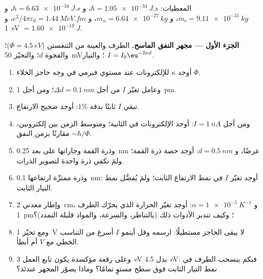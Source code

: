 \begin{problem}\label{pb:b2:potential-wells-tunneling:1}
المعطيات: $\hbar = \qty{1.05e-34}{J.s}$، و $h = \qty{6.63e-34}{J.s}$، و $m_{\text{e}} =
\qty{9.11e-31}{kg}$، و $m_\alpha = \qty{6.64e-27}{kg}$، و $e^2/4\pi\varepsilon_0 =
\qty{1.44}{MeV.fm}$، و \qty{1}{eV} $= \qty{1.60e-19}{J}$.

\textbf{الجزء الأول --- مجهر النفق الماسح.}
الطرف والعينة من التنغستن ($\Phi = \qty{4.5}{eV}$)؛ والفجوة $d$؛ والتحيّز
\qty{50}{mV}؛ والتيار $I = I_0\eu^{-2\kappa d}$.
\begin{enumerate}
  \item أوجد $\kappa$ للإلكترونات عند مستوي فيرمي في وجه حاجز
        الخلاء $\Phi$.
  \item وعامل تغيّر $I$ من أجل $\Delta d = \qty{0.1}{nm}$؛ ومن أجل
        \qty{1}{pm}.
  \item {} تبقي $I$ ثابتًا بدقة $1\%$: أوجد ضجيج الارتفاع.
  \item ومن أجل $I = \qty{1}{nA}$: أوجد الإلكترونات في الثانية؛ ومتوسط الزمن بين
        إلكترونين، مقارنًا بزمن النفق $\sim\hbar/\Phi$.
  \item وذرة القمة وجاراتها على بعد \qty{0.25}{nm} عرضًا،
        و $d = \qty{0.5}{nm}$: أوجد حصة ذرة القمة؛ ولمَ تكفي ذرة واحدة
        لتصوير الذرات.
  \item وذرة ممتزّة ارتفاعها \qty{0.1}{nm}: أوجد تغيّر $I$ في
        نمط الارتفاع الثابت؛ ولمَ يُفضَّل نمط التيار الثابت.
  \item وإطار معدني \qty{2}{cm}، و $\alpha = \qty{1e-5}{K^{-1}}$: أوجد تغيّر
        الحرارة الذي يحرّك الطرف \qty{1}{pm}؛ وكيف تتدبر الأدوات
        ذلك (بالتناظر، والسرعة، والمواد قليلة التمدد)؟
  \item ومع تحيّز \qty{1}{V} لا يبقى الحاجز مستطيلًا:
        ارسمه وقل أينمو $I$ أسرع من التناسب الخطي مع $V$ أم
        أبطأ.
  \item وعلى رقعة مؤكسدة يكون تابع العمل \qty{3}{eV} بدل
        \qty{4.5}{eV}: فبكم ينسحب الطرف في
        نمط التيار الثابت فوق سطح مستوٍ تمامًا؟ وماذا
        يصوّر المجهر عندئذ؟
\end{enumerate}


\end{problem}
